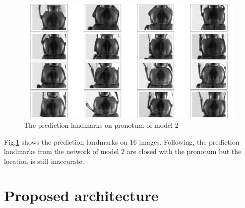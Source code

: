 \documentclass[12pt,a4paper]{article}
\begin{document}
\begin{figure}[h!]
	\centering
	\includegraphics[scale=0.25]{images/figure_1_celia}
	\caption{The prediction landmarks on pronotum of model 2}
	\label{model2pt}
\end{figure}
Fig.\ref{model2pt} shows the prediction landmarks on 16 images. Following, the prediction landmarks from the network of model 2 are closed with the pronotum but the location is still inaccurate.

\section{Proposed architecture}
\end{document}
